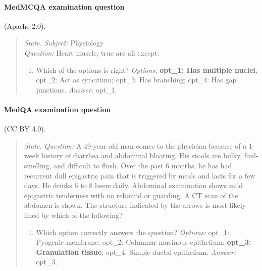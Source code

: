 \paragraph{MedMCQA examination question} (Apache-2.0).
\begin{quote}\footnotesize\raggedright
\textit{State.} \textit{Subject:} Physiology\\ \textit{Question:} Heart muscle, true are all except:
\begin{enumerate}[label=Q\arabic*.,leftmargin=2.2em,itemsep=1pt,topsep=2pt]
  \item Which of the options is right? \textit{Options:} \textbf{opt\_\allowbreak{}1: Has multiple nuclei}; opt\_\allowbreak{}2: Act as syncitium; opt\_\allowbreak{}3: Has branching; opt\_\allowbreak{}4: Has gap junctions. \textit{Answer:} opt\_1.
\end{enumerate}
\end{quote}

\paragraph{MedQA examination question} (CC BY 4.0).
\begin{quote}\footnotesize\raggedright
\textit{State.} \textit{Question:} A 49-year-old man comes to the physician because of a 1-week history of diarrhea and abdominal bloating. His stools are bulky, foul-smelling, and difficult to flush. Over the past 6 months, he has had recurrent dull epigastric pain that is triggered by meals and lasts for a few days. He drinks 6 to 8 beers daily. Abdominal examination shows mild epigastric tenderness with no rebound or guarding. A CT scan of the abdomen is shown. The structure indicated by the arrows is most likely lined by which of the following?
\begin{enumerate}[label=Q\arabic*.,leftmargin=2.2em,itemsep=1pt,topsep=2pt]
  \item Which option correctly answers the question? \textit{Options:} opt\_\allowbreak{}1: Pyogenic membrane; opt\_\allowbreak{}2: Columnar mucinous epithelium; \textbf{opt\_\allowbreak{}3: Granulation tissue}; opt\_\allowbreak{}4: Simple ductal epithelium. \textit{Answer:} opt\_3.
\end{enumerate}
\end{quote}

